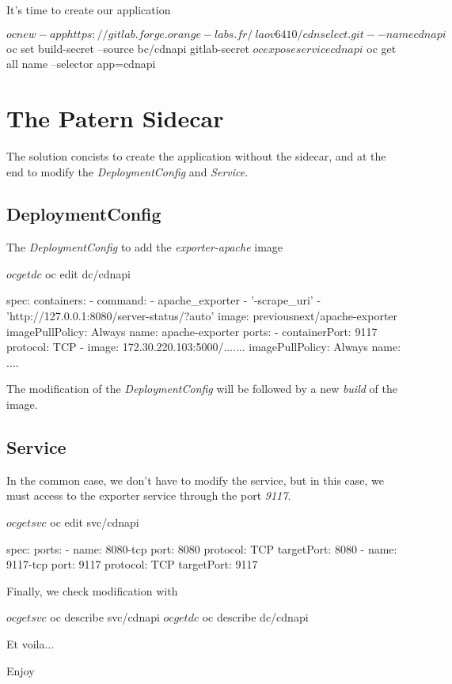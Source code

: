 It's time to create our application

\begin{bashcode}
  $ oc new-app https://gitlab.forge.orange-labs.fr/\
  laov6410/cdnselect.git --name cdnapi
  $ oc set build-secret --source bc/cdnapi gitlab-secret
  $ oc expose service cdnapi
  $ oc get all name --selector app=cdnapi
\end{bashcode}


\section{The Patern Sidecar}
The solution concists to create the application without the sidecar, and at the end to modify the \emph{DeploymentConfig} and \emph{Service}.

\subsection{DeploymentConfig}

The \emph{DeploymentConfig} to add the \emph{exporter-apache} image
\begin{bashcode}
$ oc get dc
$ oc edit dc/cdnapi
\end{bashcode}

\begin{yamlcode}
  spec:
    containers:
        - command:
            - apache_exporter
            - '-scrape_uri'
            - 'http://127.0.0.1:8080/server-status/?auto'
          image: previousnext/apache-exporter
          imagePullPolicy: Always
          name: apache-exporter
          ports:
            - containerPort: 9117
              protocol: TCP
        - image: 172.30.220.103:5000/.......
          imagePullPolicy: Always
          name: ....
\end{yamlcode}

The modification of the \emph{DeploymentConfig} will be followed by a  new \emph{build} of the image.


\subsection{Service}

In the common case, we don't have to modify the service, but in this case, we must access to the exporter service through the port \emph{9117}. 
\begin{bashcode}
  $ oc get svc
  $ oc edit svc/cdnapi
\end{bashcode}

\begin{yamlcode}
spec:
  ports:
    - name: 8080-tcp
      port: 8080
      protocol: TCP
      targetPort: 8080
    - name: 9117-tcp
      port: 9117
      protocol: TCP
      targetPort: 9117
\end{yamlcode}

Finally, we check modification with

\begin{bashcode}
  $ oc get svc
  $ oc describe svc/cdnapi
  $ oc get dc
  $ oc describe dc/cdnapi
\end{bashcode}

Et voila...

Enjoy